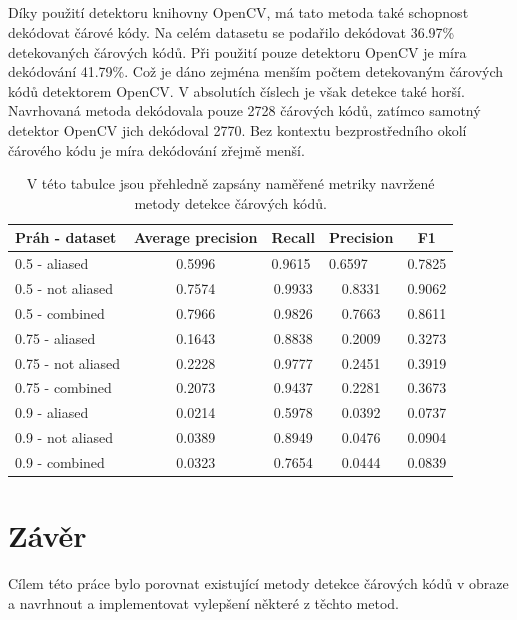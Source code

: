 \paragraph{} Díky použití detektoru knihovny OpenCV, má tato metoda také schopnost dekódovat čárové kódy. Na celém datasetu se podařilo dekódovat 36.97\% detekovaných čárových kódů. Při použití pouze detektoru OpenCV je míra dekódování 41.79\%. Což je dáno zejména menším počtem detekovaným čárových kódů detektorem OpenCV. V absolutích číslech je však detekce také horší. Navrhovaná metoda dekódovala pouze 2728 čárových kódů, zatímco samotný detektor OpenCV jich dekódoval 2770. Bez kontextu bezprostředního okolí čárového kódu je míra dekódování zřejmě menší.

\begin{table}[ht]
\centering
\begin{tabular}{|l|c|c|c|c|}
\hline
Práh - dataset     & Average precision & Recall  & Precision & F1      \\ \hline
0.5 - aliased & 0.5996 & \multicolumn{1}{l|}{0.9615} & \multicolumn{1}{l|}{ 0.6597} & \multicolumn{1}{l|}{0.7825} \\ \hline
0.5 - not aliased  & 0.7574           & 0.9933 & 0.8331   & 0.9062 \\ \hline
0.5 - combined     & 0.7966          & 0.9826 & 0.7663    & 0.8611 \\ \hline
0.75 - aliased     & 0.1643             & 0.8838  & 0.2009    & 0.3273  \\ \hline
0.75 - not aliased & 0.2228            & 0.9777 & 0.2451   & 0.3919 \\ \hline
0.75 - combined    & 0.2073            & 0.9437 & 0.2281   & 0.3673  \\ \hline
0.9 - aliased      & 0.0214              & 0.5978     & 0.0392       & 0.0737     \\ \hline
0.9 - not aliased  & 0.0389               & 0.8949     & 0.0476       & 0.0904     \\ \hline
0.9 - combined     & 0.0323               & 0.7654     & 0.0444       & 0.0839     \\ \hline
\end{tabular}
\caption{V této tabulce jsou přehledně zapsány naměřené metriky navržené metody detekce čárových kódů.}
\label{merge_table}
\end{table}


\chapter{Závěr}
\label{zaver}
Cílem této práce bylo porovnat existující metody detekce čárových kódů v obraze a navrhnout a implementovat vylepšení některé z těchto metod. 

